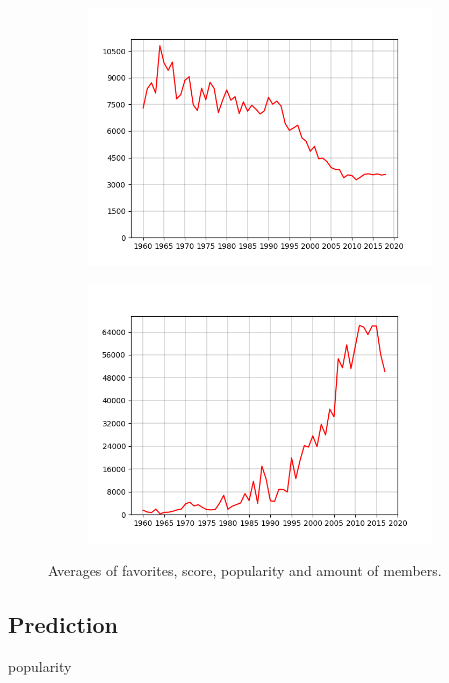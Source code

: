 \begin{frame}
\begin{figure}
\begin{subfigure}{.4\columnwidth}
		\includegraphics[width=\columnwidth]{graphics/avgPopularities.png}
	\end{subfigure}%
	\begin{subfigure}{.4\columnwidth}
		\centering
		\includegraphics[width=\columnwidth]{graphics/avgMembers.png}
	\end{subfigure}
	\caption{Averages of favorites, score, popularity and amount of members.}
\end{figure}
\end{frame}

\subsection{Prediction}
\begin{frame}
popularity
\end{frame}